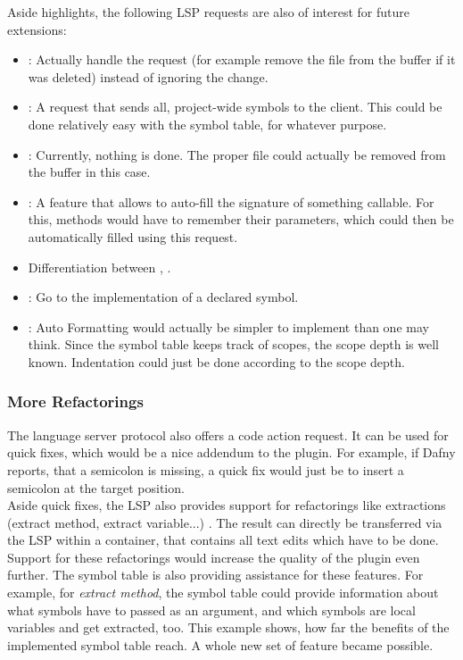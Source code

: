Aside highlights, the following LSP requests are also of interest for future extensions:
\begin{itemize}
    \item {}: Actually handle the request (for example remove the file from the buffer if it was deleted) instead of ignoring the change.
    \item {}: A request that sends all, project-wide symbols to the client. This could be done relatively easy with the symbol table, for whatever purpose.
    \item {}: Currently, nothing is done. The proper file could actually be removed from the buffer in this case.
    \item {}: A feature that allows to auto-fill the signature of something callable. For this, methods would have to remember their parameters, which could then be automatically filled using this request.
    \item Differentiation between , .
    \item {}: Go to the implementation of a declared symbol.
    \item {}: Auto Formatting would actually be simpler to implement than one may think. Since the symbol table keeps track of scopes, the scope depth is well known. Indentation could just be done according to the scope depth.
\end{itemize}

\subsubsection{More Refactorings}
The language server protocol also offers a code action request.
It can be used for quick fixes, which would be a nice addendum to the plugin.
For example, if Dafny reports, that a semicolon is missing, a quick fix would just be to insert a semicolon at the target position.\\

Aside quick fixes, the LSP also provides support for refactorings like extractions (extract method, extract variable...) \cite{lspspec}.
The result can directly be transferred via the LSP within a  container, that contains all text edits which have to be done.
Support for these refactorings would increase the quality of the plugin even further.
The symbol table is also providing assistance for these features.
For example, for \textit{extract method}, the symbol table could provide information about what symbols have to passed as an argument, and which symbols are local variables and get extracted, too.
This example shows, how far the benefits of the implemented symbol table reach.
A whole new set of feature became possible.

